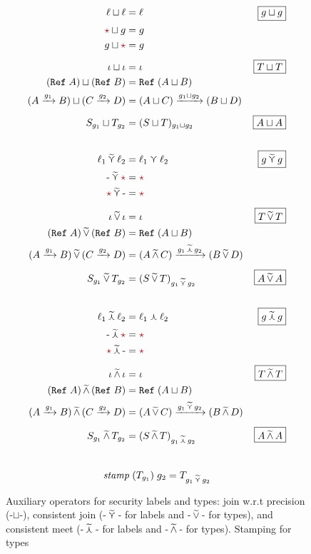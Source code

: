 \begin{figure}[tbp]
\begin{align*}
\ell \sqcup \ell &= \ell & \fbox{$g \sqcup g$}\\
\unk \sqcup g &= g \\
g \sqcup \unk &= g \\[1ex]
\iota \sqcup \iota &= \iota & \fbox{$T \sqcup T$} \\
(\Refer{A}) \sqcup (\Refer{B}) &= \Refer{(A \sqcup B)} \\
(\Fun{A}{g_1}{B}) \sqcup (\Fun{C}{g_2}{D}) &= \Fun{(A \sqcup C)}{g_1 \sqcup g_2}{(B \sqcup D)} \\[1ex]
S_{g_1} \sqcup T_{g_2} &= (S \sqcup T)_{g_1 \sqcup g_2}  & \fbox{$A \sqcup A$}
\\[4ex]
\ell_1 \lconsisjoin \ell_2 &= \ell_1 \curlyvee \ell_2 &\fbox{$g \lconsisjoin g$}\\
\text{-} \lconsisjoin \unk &= \unk \\
\unk \lconsisjoin \text{-} &= \unk \\[1ex]
\iota \consisjoin \iota &= \iota & \fbox{$T \consisjoin T$}\\
(\Refer{A}) \consisjoin (\Refer{B}) &= \Refer{(A \sqcup B)} \\
(\Fun{A}{g_1}{B}) \consisjoin (\Fun{C}{g_2}{D}) &= \Fun{(A \consismeet C)}{g_1 \lconsismeet g_2}{(B \consisjoin D)} \\[1ex]
S_{g_1} \consisjoin T_{g_2} &= (S \consisjoin T)_{g_1 \lconsisjoin g_2} & \fbox{$A \consisjoin A$}
\\[4ex]
\ell_1 \lconsismeet \ell_2 &= \ell_1 \curlywedge \ell_2 & \fbox{$g \lconsismeet g$}\\
\text{-} \lconsismeet \unk &= \unk \\
\unk \lconsismeet \text{-} &= \unk \\[1ex]
\iota \consismeet \iota &= \iota & \fbox{$T \consismeet T$} \\
(\Refer{A}) \consismeet (\Refer{B}) &= \Refer{(A \sqcup B)} \\
(\Fun{A}{g_1}{B}) \consismeet (\Fun{C}{g_2}{D}) &= \Fun{(A \consisjoin C)}{g_1 \lconsisjoin g_2}{(B \consismeet D)} \\[1ex]
S_{g_1} \consismeet T_{g_2} &= (S \consismeet T)_{g_1 \lconsismeet g_2}  & \fbox{$A \consismeet A$}
\end{align*}
\\[1ex]
\[
\mathit{stamp} \; (T_{g_1}) \; g_2 = T_{g_1 \,\widetilde{\curlyvee}\, g_2}
\]
\caption{Auxiliary operators for security labels and types: join w.r.t precision (-$\sqcup$-),
consistent join (-$\,\widetilde{\curlyvee}\,$- for labels and -$\,\widetilde{\vee}\,$- for types),
and consistent meet (-$\,\widetilde{\curlywedge}\,$- for labels and -$\,\widetilde{\wedge}\,$- for types).
Stamping for types}
\label{fig:grad-ops}
\end{figure}

